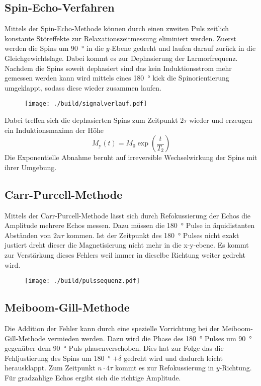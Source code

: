 \subsection{Spin-Echo-Verfahren}%
\label{sub:spin_echo_verfahren}
Mittels der Spin-Echo-Methode können durch einen zweiten Puls zeitlich
konstante Störeffekte zur Relaxationszeitmessung eliminiert werden. 
Zuerst werden die Spins um \SI{90}{\degree} in die $y$-Ebene gedreht und laufen
darauf zurück in die Gleichgewichtslage.
Dabei kommt es zur Dephasierung der Larmorfrequenz. 
Nachdem die Spins soweit dephasiert sind das kein Induktionsstrom mehr gemessen
werden kann wird mittels eines \SI{180}{\degree} kick die Spinorientierung umgeklappt, 
sodass diese wieder zusammen laufen.
\begin{figure}[h]
		\centering
		\texttt{[image: ./build/signalverlauf.pdf]}
		\caption{}
		\label{fig:sign}
\end{figure}
Dabei treffen sich die dephasierten Spins zum Zeitpunkt $2 \tau$ wieder und
erzeugen ein Induktionsmaxima der Höhe 
\begin{equation}
		\label{eq:}
		M_\text{y}(t) = M_0 \exp\left( \frac{t}{T_2} \right)
\end{equation}
Die Exponentielle Abnahme beruht auf irreversible Wechselwirkung der Spins mit
ihrer Umgebung. 

\subsection{Carr-Purcell-Methode}%
\label{sub:car_purcell}
Mittels der Carr-Purcell-Methode lässt sich durch Refokussierung der Echos die
Amplitude mehrere Echos messen. 
Dazu müssen die \SI{180}{\degree} Pulse in äquidistanten Abständen von $2n\tau$
kommen. 
Ist der Zeitpunkt des \SI{180}{\degree} Pulses nicht exakt justiert dreht dieser die
Magnetisierung nicht mehr in die x-y-ebene. 
Es kommt zur Verstärkung dieses Fehlers weil immer in dieselbe Richtung weiter
gedreht wird.

\begin{figure}[ht]
		\centering
		\texttt{[image: ./build/pulssequenz.pdf]}
		\caption{}
		\label{fig:}
\end{figure}

\subsection{Meiboom-Gill-Methode}%
\label{sub:meiboom_gill_methode}
Die Addition der Fehler kann durch eine spezielle Vorrichtung bei der
Meiboom-Gill-Methode vermieden werden.
Dazu wird die Phase des \SI{180}{\degree} Pulses um \SI{90}{\degree} gegenüber
dem \SI{90}{\degree} Puls phasenverschoben.
Dies hat zur Folge das die Fehljustierung des Spins um \SI{180}{\degree} 
$+ \delta$ gedreht wird und dadurch leicht herausklappt. 
Zum Zeitpunkt $n \cdot 4 \tau$ kommt es zur Refokussierung in $y$-Richtung.
Für gradzahlige Echos ergibt sich die richtige Amplitude.

